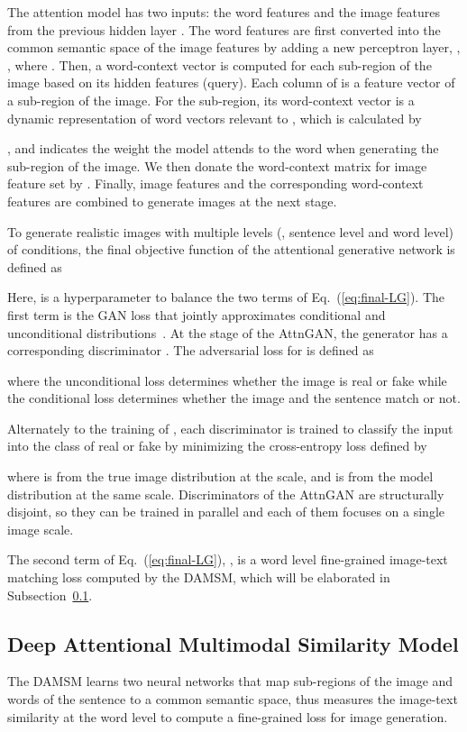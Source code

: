 \documentclass[10pt,twocolumn,letterpaper]{article}
\begin{document}
The attention model  has two inputs: the word features  and the image features from the previous hidden layer . The word features are first converted into the common semantic space of the image features by adding a new perceptron layer, \ie, , where . Then, a word-context vector is computed for each sub-region of the image based on its hidden features  (query). Each column of  is a feature vector of a sub-region of the image. For the  sub-region, its word-context vector is a dynamic representation of word vectors relevant to , which is calculated by

, and  indicates the weight the model attends to the  word when generating the   sub-region of the image.  We then donate the word-context matrix for image feature set  by . Finally, image features and the corresponding word-context features are combined to generate images at the next stage. 


To generate realistic images with multiple levels (\ie, sentence level and word level) of conditions, the final objective function of the attentional generative network is defined as

Here,  is a hyperparameter to balance the two terms of Eq.~(\ref{eq:final-LG}). The first term is the GAN loss that jointly approximates conditional and unconditional distributions~\cite{Han17stackgan2}. At the  stage of the AttnGAN, the generator  has a corresponding discriminator . The adversarial loss for  is defined as

where the unconditional loss determines whether the image is real or fake while the conditional loss determines whether the image and the sentence match or not. 

Alternately to the training of , each discriminator  is trained to classify the input into the class of real or fake by minimizing the cross-entropy loss defined by 

where  is from the true image distribution  at the  scale, and  is from the model distribution  at the same scale. Discriminators of the AttnGAN are structurally disjoint, so they can be trained in parallel and each of them focuses on a single image scale. 

The second term of Eq.~(\ref{eq:final-LG}), , is a word level fine-grained image-text matching loss computed by the DAMSM, which will be elaborated in Subsection~\ref{sec:DAMSM}. 



\subsection{Deep Attentional Multimodal Similarity Model} \label{sec:DAMSM}
\vspace{-5pt}
The DAMSM learns two neural networks that map sub-regions of the image and words of the sentence to a common semantic space, thus measures the image-text similarity at the word level to compute a fine-grained loss for image generation.  
\end{document}
